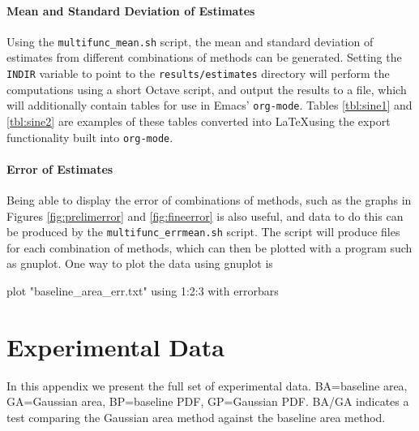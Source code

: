 \documentclass[a4paper,11pt]{article}
\begin{document}
\begin{appendices}
\paragraph{Mean and Standard Deviation of Estimates} Using the \texttt{multifunc\_mean.sh} script, the mean
and standard deviation of estimates from different combinations of methods can
be generated. Setting the \texttt{INDIR} variable to point to the
\texttt{results/estimates} directory will perform the computations using a short
Octave script, and output the results to a file, which will additionally contain
tables for use in Emacs' \texttt{org-mode}. Tables \ref{tbl:sine1} and
\ref{tbl:sine2} are examples of these tables converted into \LaTeX using the
export functionality built into \texttt{org-mode}.

\paragraph{Error of Estimates}
Being able to display the error of combinations of methods, such as the graphs
in Figures \ref{fig:prelimerror} and \ref{fig:fineerror} is also useful, and
data to do this can be produced by the \texttt{multifunc\_errmean.sh}
script. The script will produce files for each combination of methods, which can
then be plotted with a program such as gnuplot. One way to plot the data using
gnuplot is
\small
\begin{verbatimtab}
plot "baseline_area_err.txt" using 1:2:3 with errorbars
\end{verbatimtab}
\normalsize
\section{Experimental Data}
\label{sec-12}

In this appendix we present the full set of experimental data. BA=baseline area,
GA=Gaussian area, BP=baseline PDF, GP=Gaussian PDF. BA/GA indicates a test
comparing the Gaussian area method against the baseline area method.

\begin{table}[htb]


\end{table}
\end{appendices}
\end{document}

